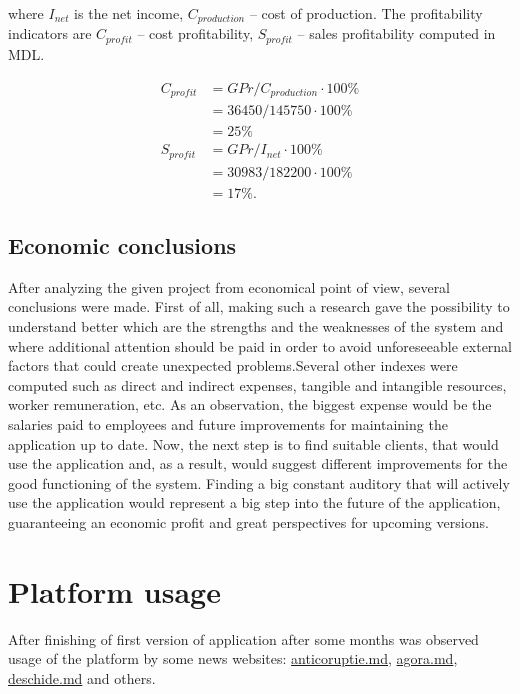 \documentclass[12pt,a4paper,titlepage]{article}
\begin{document}
\noindent
where $I_{net}$ is the net income, $C_{production}$ -- cost of production. The profitability indicators are $C_{profit}$ -- cost profitability, $S_{profit}$ -- sales profitability computed in MDL.

\begin{equation}
 \begin{split}
  C_{profit} &= GPr / C_{production} \cdot 100\%\\
              &= 36450 / 145750 \cdot 100\% \\
              &= 25 \%\\
  S_{profit} &= GPr / I_{net} \cdot 100\% \\
             &= 30983 / 182200 \cdot 100\% \\
             &= 17 \%.
 \end{split}
\end{equation}

\subsection{Economic conclusions}
After analyzing the given project from economical point of view, several conclusions were made. First of all, making such a research gave the possibility to understand better which are the strengths  and the weaknesses of the system and where additional attention should be paid in order to avoid unforeseeable external factors that could create unexpected problems.Several other indexes were computed such as direct and indirect expenses, tangible and intangible resources, worker remuneration, etc. As an observation, the biggest expense would be the salaries paid to employees and future improvements for maintaining the application up to date. Now, the next step is to find suitable clients, that would use the application  and, as a result, would suggest different improvements for the good functioning of the system. Finding a big constant auditory that will actively use the application would represent a big step into the future of the application, guaranteeing an economic profit and great perspectives for upcoming versions.
\clearpage

\newpage
{}
\section{Platform usage}
After finishing of first version of application after some months was observed usage of the platform by some news websites: \underline{anticoruptie.md}, \underline{agora.md}, \underline{deschide.md} and others.\\
\end{document}
